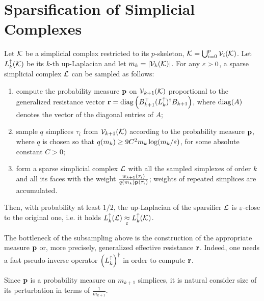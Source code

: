 \chapter{ Sparsification of Simplicial Complexes }
% 
%

\begin{thm} \label{thm:sparsify}
      Let \( \mathcal{K} \) be a simplicial complex restricted to its \(p\)-skeleton, \( \mathcal{K} = \bigcup_{i=0}^p \mathcal{V}_{i}(\mathcal{K}) \).  Let   \( L_{k}^{\uparrow} (\mathcal{K} ) \) be its  \(k\)-th up-Laplacian and let \( m_k = | \mathcal{V}_{k}(\mathcal{K}) | \). For any \( \varepsilon > 0 \), a sparse simplicial complex \( \mathcal{L} \) can be sampled as follows:
      \begin{enumerate}[leftmargin=*, label=(\arabic*)]
            \item compute the probability measure \( \mathbf{p}  \) on \( \mathcal{V}_{k+1}(\mathcal{K}) \) proportional to the generalized resistance vector \( \mathbf{r} = \operatorname{diag} \left( B_{k+1}^\top ( L_{k}^{\uparrow} )^\dagger B_{k+1} \right) \), where  $\operatorname{diag}(A)$ denotes the vector of the diagonal entries of $A$;
            \item sample \(q\) simplices \( \tau_i \) from \( \mathcal{V}_{k+1}(\mathcal{K})\) according to the probability measure \( \mathbf{p}  \),  where $q$ is chosen so that  \( q ( m_k ) \ge 9 C^2 m_{k} \log ( m_{k} / \varepsilon  )\), for some absolute constant  \( C>0 \);
            \item form a sparse simplicial complex \( \mathcal{L} \) with all the sampled simplexes of order \( k \) and all its faces with the weight \( \frac{ w_{k+1} (\tau_i) }{ q(m_k) \mathbf{p}(\tau_i)  } \); weights of repeated simplices are accumulated.
      \end{enumerate}
      Then, with probability at least \(1/2\), the up-Laplacian of the sparsifier \( \mathcal{L} \) is \(\varepsilon\)-close to the original one, i.e. it holds \( L_{k}^{\uparrow} (\mathcal{L} ) \underset{\varepsilon}{\approx} L_{k}^{\uparrow} (\mathcal{K}) \).
\end{thm}

The bottleneck of the subsampling above is the construction of the appropriate measure \( \mathbf{p} \) or, more precisely, generalized effective resistance \( \mathbf{r} \). Indeed, one needs a fast pseudo-inverse operator \( \left(  L_{k}^{\uparrow} \right)^\dagger \) in order to compute \( \mathbf{r} \).


\begin{remark}
      Since \( \mathbf{p} \) is a probability measure on \( m_{k+1} \) simplices, it is natural consider size of its perturbation in terms of \( \frac{1}{m_{k+1}}\).
\end{remark}







